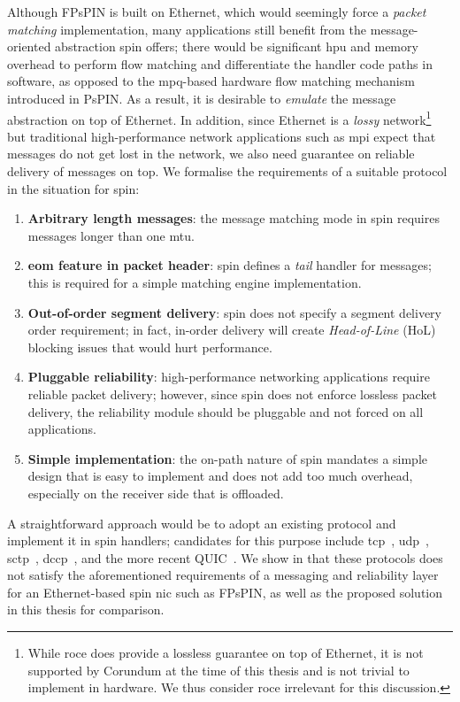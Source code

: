 Although FPsPIN is built on Ethernet, which would seemingly force a \emph{packet matching} implementation, many applications still benefit from the message-oriented abstraction \ac{spin} offers; there would be significant \ac{hpu} and memory overhead to perform flow matching and differentiate the handler code paths in software, as opposed to the \ac{mpq}-based hardware flow matching mechanism introduced in PsPIN.  As a result, it is desirable to \emph{emulate} the message abstraction on top of Ethernet.  In addition, since Ethernet is a \emph{lossy} network\footnote{While \ac{roce} does provide a lossless guarantee on top of Ethernet, it is not supported by Corundum at the time of this thesis and is not trivial to implement in hardware.  We thus consider \ac{roce} irrelevant for this discussion.} but traditional high-performance network applications such as \ac{mpi} expect that messages do not get lost in the network, we also need guarantee on reliable delivery of messages on top.  We formalise the requirements of a suitable protocol in the situation for \ac{spin}:

\begin{enumerate}[label=\protect\circled{\arabic*}]
    \item \textbf{Arbitrary length messages}: the message matching mode in \ac{spin} requires messages longer than one \ac{mtu}.
    \item \textbf{\ac{eom} feature in packet header}: \ac{spin} defines a \emph{tail} handler for messages; this is required for a simple matching engine implementation.
    \item \textbf{Out-of-order segment delivery}: \ac{spin} does not specify a segment delivery order requirement; in fact, in-order delivery will create \emph{Head-of-Line} (HoL) blocking issues that would hurt performance.
    \item \textbf{Pluggable reliability}: high-performance networking applications require reliable packet delivery; however, since \ac{spin} does not enforce lossless packet delivery, the reliability module should be pluggable and not forced on all applications.
    \item \textbf{Simple implementation}: the on-path nature of \ac{spin} mandates a simple design that is easy to implement and does not add too much overhead, especially on the receiver side that is offloaded.
\end{enumerate}

A straightforward approach would be to adopt an existing protocol and implement it in \ac{spin} handlers; candidates for this purpose include \ac{tcp}~\cite{eddy_transmission_2022}, \ac{udp}~\cite{j_user_1980}, \ac{sctp}~\cite{stewart_stream_2007}, \ac{dccp}~\cite{floyd_datagram_2006}, and the more recent QUIC~\cite{iyengar_quic_2021}.  We show in  that these protocols does not satisfy the aforementioned requirements of a messaging and reliability layer for an Ethernet-based \ac{spin} \ac{nic} such as FPsPIN, as well as the proposed solution in this thesis for comparison.

